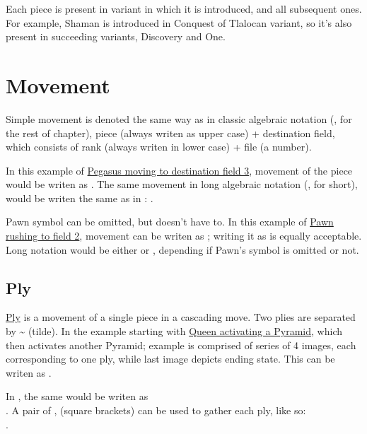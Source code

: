 Each piece is present in variant in which it is introduced, and all subsequent ones.
For example, Shaman is introduced in Conquest of Tlalocan variant, so it's also present
in succeeding variants, Discovery and One.

\clearpage %

\section*{Movement}
\label{sec:Appendix/Movement}

Simple movement is denoted the same way as in classic algebraic notation (,
for the rest of chapter), piece (always writen as upper case) + destination field, which
consists of rank (always writen in lower case) + file (a number).

In this example of \hyperref[fig:scn_ct_03_define_step_ply]{Pegasus moving to destination field 3},
movement of the piece would be writen as . The same movement in long algebraic notation
(, for short), would be writen the same as in : .

Pawn symbol can be omitted, but doesn't have to. In this example of
\hyperref[fig:04_croatian_ties_en_passant]{Pawn rushing to field 2}, movement can be
writen as ; writing it as  is equally acceptable. Long notation would be
either  or , depending if Pawn's symbol is omitted or not.

\subsection*{Ply}
\label{sec:Appendix/Ply}

\hyperref[sec:Terms/Ply]{Ply} is a movement of a single piece in a cascading move. Two plies
are separated by \~{} (tilde). In the example starting with
\hyperref[fig:scn_ma_11_cascading_init]{Queen activating a Pyramid}, which then activates another
Pyramid; example is comprised of series of 4 images, each corresponding to one ply, while last
image depicts ending state. This can be writen as .

In , the same would be writen as \\
. A pair of \alg{[}, \alg{]} (square brackets) can be used to
gather each ply, like so: \\
\alg{[Qk2-f7]\~{}[Af7-i7]\~{}[Ai7-i9]}.

